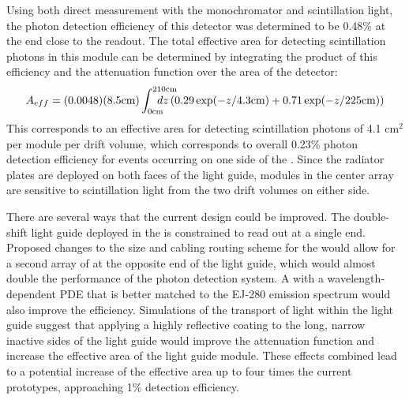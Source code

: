 Using both direct measurement with the monochromator and scintillation light, the photon detection efficiency of this detector was determined to be 0.48\% at the end close to the  readout. The total effective area for detecting  scintillation photons in this module can be determined by integrating the product of this efficiency and the attenuation function over the area of the detector:
\begin{equation*}
  A_{eff} = (0.0048) (8.5\text{cm}) \int_{0\text{cm}}^{210\text{cm}} \hspace{-2em}dz \left( 0.29 \exp(-z/4.3\text{cm}) + 0.71 \exp(-z/225\text{cm}) \right)
\end{equation*}
This corresponds to an effective area for detecting  scintillation photons of 4.1 cm$^{2}$ per module per drift volume, which corresponds to overall 0.23\% photon detection efficiency for events occurring on one side of the .
Since the radiator plates are deployed on both faces of the light guide, modules in the center  array are sensitive to scintillation light from the two drift volumes on either side. 




There are several ways that the current design could be improved. The double-shift light guide deployed in the   is constrained to read out at a single end. Proposed changes to the  size and cabling routing scheme for the  would allow for a second array of  at the opposite end of the light guide, which would almost double the performance of the photon detection system.
A  with a wavelength-dependent PDE that is better matched to the EJ-280 emission spectrum would also improve the efficiency. Simulations of the transport of light within the light guide suggest that applying a highly reflective coating to the long, narrow inactive sides of the light guide would improve the attenuation function and increase the effective area of the light guide module. These effects combined lead to a potential increase of the effective area up to four times the current prototypes, approaching 1\% detection efficiency.

